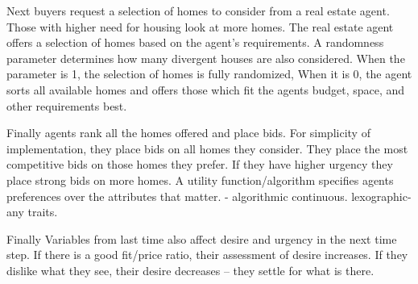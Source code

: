 Next buyers request a selection of homes to consider from a real estate agent. Those with higher need for housing look at more homes. The real estate agent offers a selection of homes based on the agent's requirements. A randomness parameter determines how many divergent houses are also considered. When the parameter is 1, the selection of homes is fully randomized, When it is 0, the agent sorts all available homes and offers those which fit the agents budget, space, and other requirements best.

Finally agents rank all the homes offered and place bids.  For simplicity of implementation, they place bids on all homes they consider. They place the most competitive bids on those homes they prefer. If they have higher urgency they place strong bids on more homes. 
A utility function/algorithm specifies agents preferences over the attributes that matter. - algorithmic continuous. lexographic- any traits. 

Finally Variables from last time also affect desire and urgency in the next time step. If there is a good fit/price ratio, their assessment of desire increases. If they dislike what they see, their desire decreases -- they settle for what is there. 



%
%
%
%
%
%




